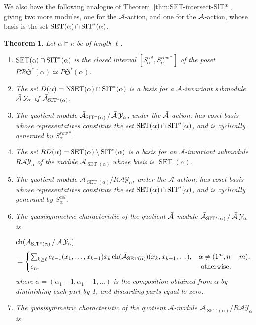 \documentclass[12pt,letterpaper]{amsart}
\newtheorem{theorem}{Theorem}[section]
\theoremstyle{definition}
\newcommand{\dI}{\mathfrak{S}^*}
\newcommand{\rdI}{\mathcal{R}\mathfrak{S}^*}
\newcommand{\SET}{\ensuremath{\operatorname{SET}}} \newcommand{\NSET}{\ensuremath{\operatorname{NSET}}}\newcommand{\SRCT}{\ensuremath{\operatorname{SRCT}}}
\begin{document}
  We also have the following analogue of Theorem~\ref{thm:SET-intersect-SIT*}, giving 
 two more modules, one for the $\mathcal{A}$-action, and one for the $\operatorname{\bar{\mathcal{A}}}$-action, whose basis is the set $\SET(\alpha)\cap\SIT^*(\alpha)$. 
\begin{theorem}\label{thm:A-barA-SET-intersect-SIT*} Let $\alpha\vDash n$ be of length $\ell$.
\begin{enumerate}
\item $\SET(\alpha)\cap\SIT^*(\alpha)$ is the closed interval $[S^{col}_\alpha, S^{row*}_\alpha]$ of the poset $P\rdI(\alpha)\simeq P\dI(\alpha)$.
\item The set $D(\alpha)=\NSET(\alpha)\cap \SIT^*(\alpha)$ is a basis for a $\operatorname{\bar{\mathcal{A}}}$-invariant submodule $\operatorname{\bar{\mathcal{A}}}\mathcal{Y}_\alpha$ of $\operatorname{\bar{\mathcal{A}}}_{\operatorname{SIT}^*(\alpha)}$. 
\item The quotient module $\operatorname{\bar{\mathcal{A}}}_{\operatorname{SIT}^*(\alpha)}/\operatorname{\bar{\mathcal{A}}}\mathcal{Y}_\alpha$, under the $\operatorname{\bar{\mathcal{A}}}$-action,  has coset basis whose representatives constitute the set $\SET(\alpha)\cap\SIT^*(\alpha)$, and is cyclically generated by $S^{row*}_\alpha$. 
\item The set $RD(\alpha)=\SET(\alpha)\setminus \SIT^*(\alpha)$ is a basis for an $\mathcal{A}$-invariant submodule ${R\mathcal{A}\mathcal{Y}}_\alpha$ of the module $\mathcal{A}_{\SET(\alpha)}$ whose basis is $\SET(\alpha)$. 
\item The quotient module  $\mathcal{A}_{\SET(\alpha)}/R\mathcal{A}{\mathcal{Y}}_\alpha$, under the $\mathcal{A}$-action, has coset basis
 whose representatives constitute the set $\SET(\alpha)\cap\SIT^*(\alpha)$, and is cyclically generated by $S^{col}_\alpha$.
\item The quasisymmetric characteristic of the quotient $\operatorname{\bar{\mathcal{A}}}$-module $\operatorname{\bar{\mathcal{A}}}_{\operatorname{SIT}^*(\alpha)}/\operatorname{\bar{\mathcal{A}}}\mathcal{Y}_\alpha$ is 

$\operatorname{\mathrm{ch}}(\operatorname{\bar{\mathcal{A}}}_{\operatorname{SIT}^*(\alpha)}/\operatorname{\bar{\mathcal{A}}}\mathcal{Y}_\alpha)$
\begin{equation}\label{eqn:Elizabeth2022Feb21-barA}
=\begin{cases}
\sum _{k\geq \ell} e_{\ell -1} (x_1, \ldots, x_{k-1}) x_k \chr(\bA_{\SET(\overline{\alpha})})(x_k,x_{k+1},\ldots), 
& \alpha \neq (1^m,n-m),\\
e_n, &\text{ otherwise},
\end{cases}
\end{equation}
where $\overline{\alpha}=(\alpha_1-1, \alpha_1-1,\ldots)$ is the composition obtained from $\alpha$ by diminishing each part by 1, and discarding parts equal to zero. 
\item The quasisymmetric characteristic of the quotient $\mathcal{A}$-module $\mathcal{A}_{\SET(\alpha)}/R\mathcal{A}\mathcal{Y}_\alpha$ is


\end{enumerate}
\end{theorem}
\end{document}
